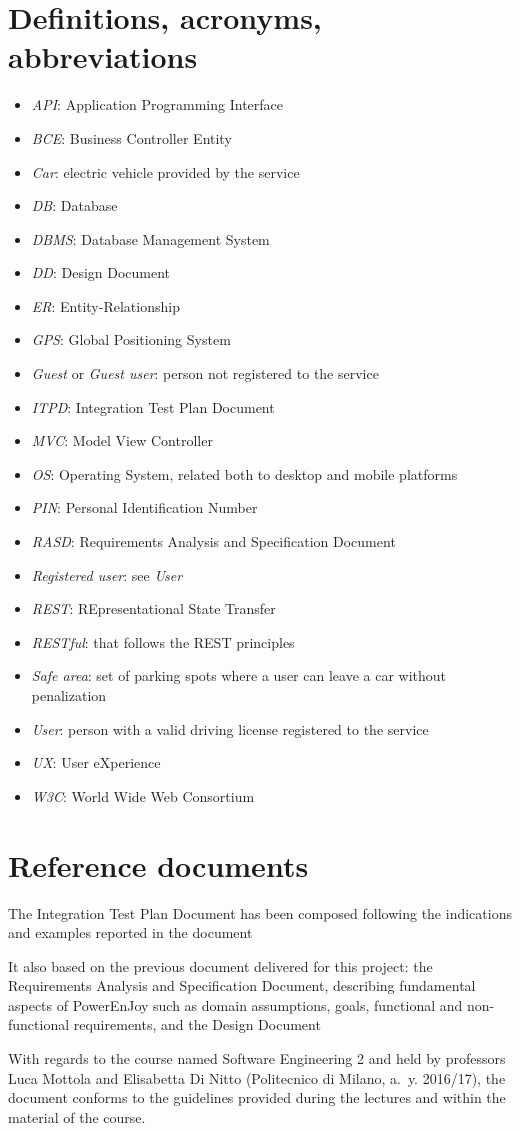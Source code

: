 \section{Definitions, acronyms, abbreviations}
\begin{itemize}
	\item \emph{API}: Application Programming Interface
	\item \emph{BCE}: Business Controller Entity
	\item \emph{Car}: electric vehicle provided by the service
	\item \emph{DB}: Database
	\item \emph{DBMS}: Database Management System
	\item \emph{DD}: Design Document
	\item \emph{ER}: Entity-Relationship
	\item \emph{GPS}: Global Positioning System
	\item \emph{Guest} or \emph{Guest user}: person not registered to the service
	\item \emph{ITPD}: Integration Test Plan Document
	\item \emph{MVC}: Model View Controller
	\item \emph{OS}: Operating System, related both to desktop and mobile platforms
	\item \emph{PIN}: Personal Identification Number
	\item \emph{RASD}: Requirements Analysis and Specification Document
	\item \emph{Registered user}: see \emph{User}
	\item \emph{REST}: REpresentational State Transfer
	\item \emph{RESTful}: that follows the REST principles
	\item \emph{Safe area}: set of parking spots where a user can leave a car without penalization 
	\item \emph{User}: person with a valid driving license registered to the service
	\item \emph{UX}: User eXperience
	\item \emph{W3C}: World Wide Web Consortium
\end{itemize}

\section{Reference documents}
The Integration Test Plan Document has been composed following the indications and examples reported in the document 

It also based on the previous document delivered for this project: the Requirements Analysis and Specification Document, describing fundamental aspects of PowerEnJoy such as domain assumptions, goals, functional and non-functional requirements, and the Design Document

With regards to the course named Software Engineering 2 and held by professors Luca Mottola and Elisabetta Di Nitto (Politecnico di Milano, a.~y. 2016/17), the document conforms to the guidelines provided during the lectures and within the material of the course.